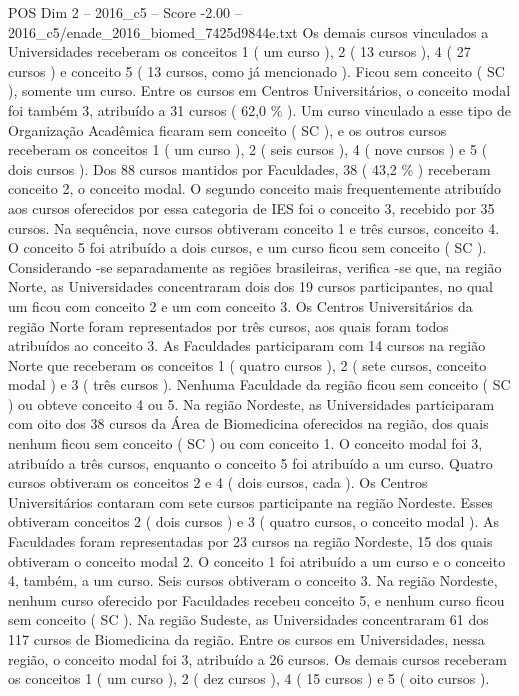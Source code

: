 \begin{textsample}{POS Dim 2 – 2016\_c5 – Score -2.00 – 2016\_c5/enade\_2016\_biomed\_7425d9844e.txt}
Os demais cursos vinculados a Universidades receberam os conceitos 1 ( um curso ), 2 ( 13 cursos ), 4 ( 27 cursos ) e conceito 5 ( 13 cursos, como já mencionado ).
Ficou sem conceito ( SC ), somente um curso.
Entre os cursos em Centros Universitários, o conceito modal foi também 3, atribuído a 31 cursos ( 62,0 \% ).
Um curso vinculado a esse tipo de Organização Acadêmica ficaram sem conceito ( SC ), e os outros cursos receberam os conceitos 1 ( um curso ), 2 ( seis cursos ), 4 ( nove cursos ) e 5 ( dois cursos ).
Dos 88 cursos mantidos por Faculdades, 38 ( 43,2 \% ) receberam conceito 2, o conceito modal.
O segundo conceito mais frequentemente atribuído aos cursos oferecidos por essa categoria de IES foi o conceito 3, recebido por 35 cursos.
Na sequência, nove cursos obtiveram conceito 1 e três cursos, conceito 4.
O conceito 5 foi atribuído a dois cursos, e um curso ficou sem conceito ( SC ).
Considerando -se separadamente as regiões brasileiras, verifica -se que, na região Norte, as Universidades concentraram dois dos 19 cursos participantes, no qual um ficou com conceito 2 e um com conceito 3.
Os Centros Universitários da região Norte foram representados por três cursos, aos quais foram todos atribuídos ao conceito 3.
As Faculdades participaram com 14 cursos na região Norte que receberam os conceitos 1 ( quatro cursos ), 2 ( sete cursos, conceito modal ) e 3 ( três cursos ).
Nenhuma Faculdade da região ficou sem conceito ( SC ) ou obteve conceito 4 ou 5.
Na região Nordeste, as Universidades participaram com oito dos 38 cursos da Área de Biomedicina oferecidos na região, dos quais nenhum ficou sem conceito ( SC ) ou com conceito 1.
O conceito modal foi 3, atribuído a três cursos, enquanto o conceito 5 foi atribuído a um curso.
Quatro cursos obtiveram os conceitos 2 e 4 ( dois cursos, cada ).
Os Centros Universitários contaram com sete cursos participante na região Nordeste.
Esses obtiveram conceitos 2 ( dois cursos ) e 3 ( quatro cursos, o conceito modal ).
As Faculdades foram representadas por 23 cursos na região Nordeste, 15 dos quais obtiveram o conceito modal 2.
O conceito 1 foi atribuído a um curso e o conceito 4, também, a um curso.
Seis cursos obtiveram o conceito 3.
Na região Nordeste, nenhum curso oferecido por Faculdades recebeu conceito 5, e nenhum curso ficou sem conceito ( SC ).
Na região Sudeste, as Universidades concentraram 61 dos 117 cursos de Biomedicina da região.
Entre os cursos em Universidades, nessa região, o conceito modal foi 3, atribuído a 26 cursos.
Os demais cursos receberam os conceitos 1 ( um curso ), 2 ( dez cursos ), 4 ( 15 cursos ) e 5 ( oito cursos ).

\end{textsample}
